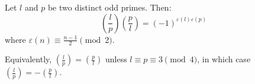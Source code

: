 Let $l$ and $p$ be two distinct odd primes. Then:
$$\left(\frac{l}{p}\right) \left(\frac{p}{l}\right) = (-1)^{\varepsilon(l)\varepsilon(p)}$$
where $\varepsilon(n) \equiv \frac{n-1}{2} \pmod{2}$.

Equivalently, $\left(\frac{l}{p}\right) = \left(\frac{p}{l}\right)$ unless $l \equiv p \equiv 3 \pmod{4}$, in which case $\left(\frac{l}{p}\right) = -\left(\frac{p}{l}\right)$.

